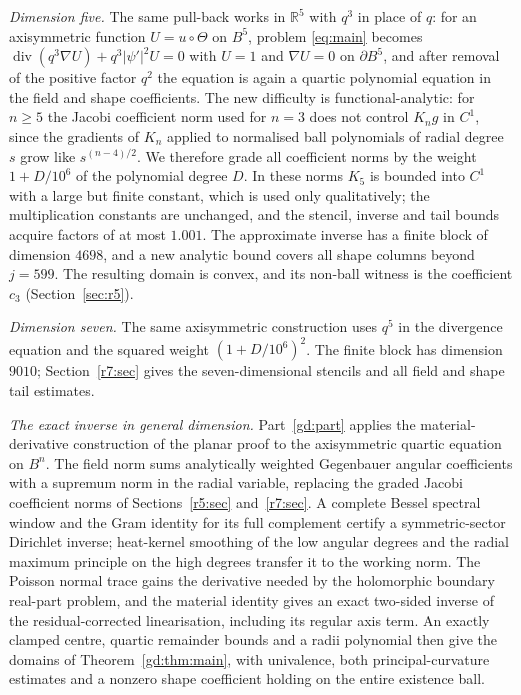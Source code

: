 \documentclass[11pt]{amsart}
\theoremstyle{definition}
\theoremstyle{remark}
\numberwithin{equation}{section}
\newcommand{\R}{\mathbb{R}}
\begin{document}
\emph{Dimension five.} The same pull-back works in $\R^5$ with $q^3$ in place of $q$: for an axisymmetric function $U=u\circ\Theta$ on $B^5$, problem \eqref{eq:main} becomes $\operatorname{div}(q^3\nabla U)+q^3|\psi'|^2U=0$ with $U=1$ and $\nabla U=0$ on $\partial B^5$, and after removal of the positive factor $q^2$ the equation is again a quartic polynomial equation in the field and shape coefficients. The new difficulty is functional-analytic: for $n\geq5$ the Jacobi coefficient norm used for $n=3$ does not control $K_ng$ in $C^1$, since the gradients of $K_n$ applied to normalised ball polynomials of radial degree $s$ grow like $s^{(n-4)/2}$. We therefore grade all coefficient norms by the weight $1+D/10^6$ of the polynomial degree $D$. In these norms $K_5$ is bounded into $C^1$ with a large but finite constant, which is used only qualitatively; the multiplication constants are unchanged, and the stencil, inverse and tail bounds acquire factors of at most $1.001$. The approximate inverse has a finite block of dimension $4698$, and a new analytic bound covers all shape columns beyond $j=599$. The resulting domain is convex, and its non-ball witness is the coefficient $c_3$ (Section~\ref{sec:r5}).

\emph{Dimension seven.} The same axisymmetric construction uses $q^5$ in the divergence equation and the squared weight $(1+D/10^6)^2$. The finite block has dimension $9010$; Section~\ref{r7:sec} gives the seven-dimensional stencils and all field and shape tail estimates.

\emph{The exact inverse in general dimension.}
Part~\ref{gd:part} applies the material-derivative construction of the planar proof to the axisymmetric quartic equation on $B^n$.
The field norm sums analytically weighted Gegenbauer angular coefficients with a supremum norm in the radial variable, replacing the graded Jacobi coefficient norms of Sections~\ref{r5:sec} and~\ref{r7:sec}.
A complete Bessel spectral window and the Gram identity for its full complement certify a symmetric-sector Dirichlet inverse; heat-kernel smoothing of the low angular degrees and the radial maximum principle on the high degrees transfer it to the working norm.
The Poisson normal trace gains the derivative needed by the holomorphic boundary real-part problem, and the material identity gives an exact two-sided inverse of the residual-corrected linearisation, including its regular axis term.
An exactly clamped centre, quartic remainder bounds and a radii polynomial then give the domains of Theorem~\ref{gd:thm:main}, with univalence, both principal-curvature estimates and a nonzero shape coefficient holding on the entire existence ball.
\end{document}
